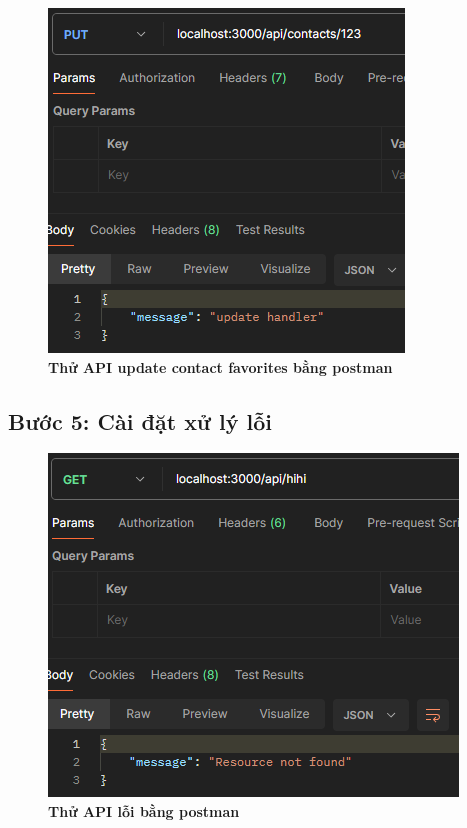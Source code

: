 \begin{figure}[H]
  \centering
  \includegraphics{images/chapterFirst/15.png}
  \caption{\bfseries Thử API update contact favorites bằng postman}
\end{figure}
\subsection*{Bước 5: Cài đặt xử lý lỗi}
\setcounter{subsection}{5}
\setcounter{figure}{0}
\begin{figure}[H]
  \centering
  \includegraphics{images/chapterFirst/16.png}
  \caption{\bfseries Thử API lỗi bằng postman}
\end{figure}